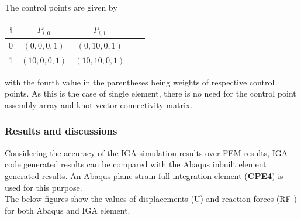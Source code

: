 \documentclass[11pt]{article}
\begin{document}
\begin{enumerate}

	The control points are given by
	\begin{center}
		\begin{tabular}{ |c|c|c|c|c| } 
			\hline
			i & $ P_{i,0} $ & $ P_{i,1} $  \\ \hline
			0 & $ (0,0,0,1) $ & $ (0,10,0,1) $  \\ \hline
			1 & $ (10,0,0,1) $ & $ (10,10,0,1) $  \\ \hline
			
		\end{tabular}
	\end{center}
	with the fourth value in the parentheses being weights of respective control points.
	As this is the case of single element, there is no need for the control point
	assembly array and knot vector connectivity matrix.
\end{enumerate}
\subsubsection{Results and discussions} \label{ResultsMech}
Considering the accuracy of the IGA simulation results over FEM results, IGA code generated results can be compared with the Abaqus inbuilt element generated results. An Abaqus plane strain full integration element (\textbf{CPE4}) \cite{abaqus10version} is used for this purpose.
\\The below figures show the values of displacements (U) and reaction forces (RF ) for both Abaqus and IGA element.\\
\end{document}
